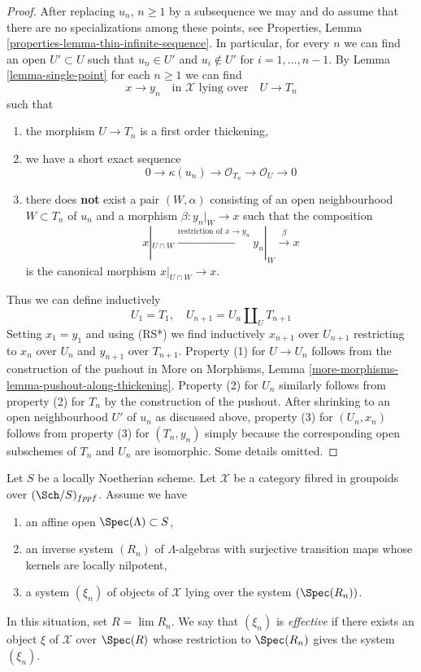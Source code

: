 \begin{proof}
After replacing $u_n$, $n \geq 1$ by a subsequence we may and do
assume that there are no specializations among these points, see
Properties, Lemma \ref{properties-lemma-thin-infinite-sequence}.
In particular, for every $n$ we can find an open $U' \subset U$
such that $u_n \in U'$ and $u_i \not \in U'$ for $i = 1, \ldots, n - 1$.
By Lemma \ref{lemma-single-point} for each $n \geq 1$ we can find
$$
x \to y_n
\quad\text{in }\mathcal{X}\text{ lying over}\quad
U \to T_n
$$
such that
\begin{enumerate}
\item the morphism $U \to T_n$ is a first order thickening,
\item we have a short exact sequence
$$
0 \to \kappa(u_n) \to \mathcal{O}_{T_n} \to \mathcal{O}_U \to 0
$$
\item there does {\bf not} exist a pair $(W, \alpha)$
consisting of an open neighbourhood $W \subset T_n$ of $u_n$
and a morphism $\beta : y_n|_W \to x$ such that the composition
$$
x|_{U \cap W} \xrightarrow{\text{restriction of }x \to y_n}
y_n|_W \xrightarrow{\beta} x
$$
is the canonical morphism $x|_{U \cap W} \to x$.
\end{enumerate}
Thus we can define inductively
$$
U_1 = T_1, \quad
U_{n + 1} = U_n \amalg_U T_{n + 1}
$$
Setting $x_1 = y_1$ and using (RS*) we find inductively
$x_{n + 1}$ over $U_{n + 1}$ restricting to
$x_n$ over $U_n$ and $y_{n + 1}$ over $T_{n + 1}$.
Property (1) for $U \to U_n$ follows from the construction
of the pushout in More on Morphisms, Lemma
\ref{more-morphisms-lemma-pushout-along-thickening}.
Property (2) for $U_n$ similarly follows from
property (2) for $T_n$ by the construction of the pushout.
After shrinking to an open neighbourhood $U'$ of $u_n$
as discussed above, property (3) for $(U_n, x_n)$ follows from property (3)
for $(T_n, y_n)$ simply because the corresponding open subschemes
of $T_n$ and $U_n$ are isomorphic. Some details omitted.
\end{proof}

\begin{remark}
\label{remark-strong-effectiveness}
Let $S$ be a locally Noetherian scheme.
Let $\mathcal{X}$ be a category fibred in groupoids over $(\Sch/S)_{fppf}$.
Assume we have
\begin{enumerate}
\item an affine open $\Spec(\Lambda) \subset S$,
\item an inverse system $(R_n)$ of $\Lambda$-algebras
with surjective transition maps whose kernels are locally nilpotent,
\item a system $(\xi_n)$ of objects of $\mathcal{X}$ lying
over the system $(\Spec(R_n))$.
\end{enumerate}
In this situation, set $R = \lim R_n$. We say that
$(\xi_n)$ is {\it effective} if there exists an object
$\xi$ of $\mathcal{X}$ over $\Spec(R)$ whose restriction
to $\Spec(R_n)$ gives the system $(\xi_n)$.
\end{remark}

